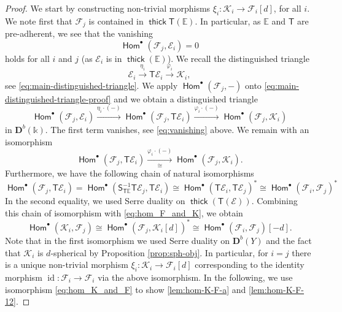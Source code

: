 \documentclass[a4paper,11pt, reqno]{amsart}
\def\E{\mathbb E}
\def\DD{\mathbf D}
\def\sE{\mathscr{E}}
\def\sF{\mathscr{F}}
\def\sK{\mathscr{K}}
\def\id{{\operatorname{id}}}
\newcommand{\opname}[1]{\operatorname{\mathsf{#1}}}
\newcommand{\Hom}{\opname{Hom}}
\newcommand{\thick}{\opname{thick}\nolimits}
\def\Db{\DD^b}
\newcommand{\bS}{\mathsf{S}}
\newcommand{\bT}{\mathsf{T}}
\theoremstyle{plain}
\theoremstyle{definition}
\numberwithin{equation}{section}
\newlength{\arrow}
\begin{document}
\begin{proof}
    We start by constructing non-trivial morphisms $\xi_{i} \colon \sK_i \to \sF_i [d]$, for all $i$.
We note first that $\sF_j $ is contained in $\thick \bT ( \E)$.
In particular, as $\E$ and $\bT$ are pre-adherent, we see that the vanishing
\begin{equation}\label{eq:vanishing}
    \Hom^\bullet ( \sF_j , \sE_i ) =  0 
\end{equation}
holds for all $i$ and $j$ (as $\sE_i$  is in $\thick ( \E)$).
We recall the distinguished triangle 
\begin{equation}\label{eq:main-distinguished-triangle-proof}
    \sE_i \xrightarrow{\eta_i } \bT  \sE_i   \xrightarrow{\varphi_i } \sK_i ,
\end{equation}
see \eqref{eq:main-distinguished-triangle}.
We apply $\Hom^\bullet ( \sF_j , - )$ onto \eqref{eq:main-distinguished-triangle-proof} and we obtain a distinguished triangle
\[
\Hom^\bullet ( \sF_j  , \sE_i  ) \xrightarrow{\eta_i \cdot (-)} \Hom^\bullet ( \sF_j , \bT  \sE_i    ) \xrightarrow{\varphi_i \cdot (-)} \Hom^\bullet ( \sF_j , \sK_i ) 
\]
in $\Db (\mathbb{k})$.
The first term vanishes, see \eqref{eq:vanishing} above.
We remain with an isomorphism
\begin{equation}\label{eq:hom_F_and_K}
    \Hom^\bullet ( \sF_j , \bT  \sE_i    ) \xrightarrow[\cong]{\varphi_i \cdot (-)} \Hom^\bullet ( \sF_j , \sK_i  ) .
\end{equation}
Furthermore, we have the following chain of natural isomorphisms
\[
\Hom^\bullet ( \sF_j , \bT  \sE_i     ) = \Hom^\bullet ( \bS^{-1}_{\bT\E}\bT  \sE_j   , \bT \sE_i   ) \cong \Hom^\bullet (  \bT  \sE_i  , \bT  \sE_j   )^\ast \cong \Hom^\bullet ( \sF_i , \sF_j  )^* 
\]
In the second equality, we used Serre duality on $\thick ( \bT ( \sE ) )$.
Combining this chain of isomorphism with \eqref{eq:hom_F_and_K}, we obtain
\begin{equation}\label{eq:hom_K_and_F}
    \Hom^\bullet ( \sK_i , \sF_j   ) \cong \Hom^\bullet ( \sF_j    , \sK_i [d] )^\ast \cong \Hom^\bullet ( \sF_i , \sF_j ) [-d]  . 
\end{equation}
Note that in the first isomorphism we used Serre duality on $\Db (Y)$ and the fact that $\sK_i$ is $d$-spherical by Proposition \ref{prop:sph-obj}.
In particular, for $i=j$ there is a unique non-trivial morphism $\xi_i \colon \sK_i \to \sF_i  [d]$ corresponding to the identity morphism $\id \colon \sF_i \to \sF_i $ via the above isomorphism.
In the following, we use isomorphism \eqref{eq:hom_K_and_F} to show  \eqref{lem:hom-K-F-a} and \eqref{lem:hom-K-F-12}.


\end{proof}
\end{document}
